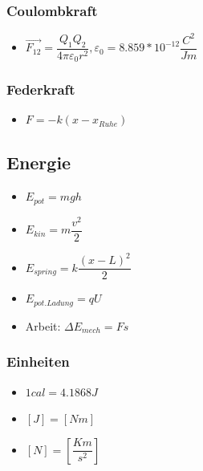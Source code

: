 \documentclass[6pt,a4paper]{scrartcl}
\begin{document}
\begin{multicols*}{4}
				\subsubsection{Coulombkraft}
					\begin{itemize}\itemsep0pt				
						\item $\overrightarrow{F_{12}}=\dfrac{Q_{1}Q_{2}}{4\pi\varepsilon_{0}r^{2}}, \varepsilon_{0}=8.859*10^{-12}\dfrac{C^{2}}{Jm}$
					\end{itemize}
				\subsubsection{Federkraft}
					\begin{itemize}\itemsep0pt				
						\item $F = -k(x-x_{Ruhe})$
					\end{itemize}
			
		\subsection{Energie}
			\begin{itemize}\itemsep0pt				
				\item $E_{pot}=mgh$
				\item $E_{kin}=m\dfrac{v^{2}}{2}$
				\item $E_{spring}=k\dfrac{(x-L)^{2}}{2}$
				\item $E_{pot. Ladung}=qU$
				\item Arbeit: $\Delta E_{mech}=Fs$			
			\end{itemize}
			\subsubsection{Einheiten}		
			\begin{itemize}\itemsep0pt		
				\item $1 cal = 4.1868 J$		
				\item $[J]=[Nm]$
				\item $[N]=[\dfrac{Km}{s^{2}}]$
			\end{itemize}


\end{multicols*}
\end{document}
